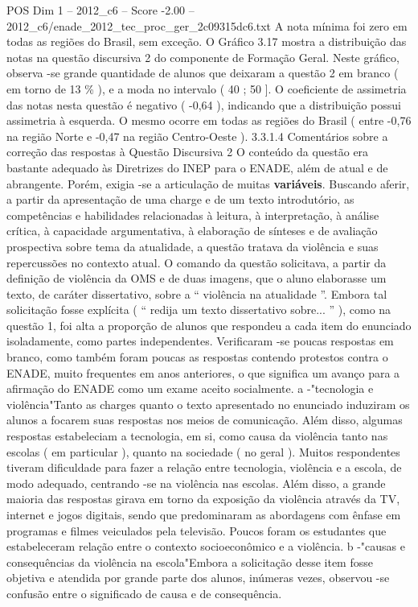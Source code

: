 \begin{textsample}{POS Dim 1 – 2012\_c6 – Score -2.00 – 2012\_c6/enade\_2012\_tec\_proc\_ger\_2c09315dc6.txt}
A nota mínima foi zero em todas as regiões do Brasil, sem exceção.
O Gráfico 3.17 mostra a distribuição das notas na questão discursiva 2 do componente de Formação Geral.
Neste gráfico, observa -se grande quantidade de alunos que deixaram a questão 2 em branco ( em torno de 13 \% ), e a moda no intervalo ( 40 ; 50 ].
O coeficiente de assimetria das notas nesta questão é negativo ( -0,64 ), indicando que a distribuição possui assimetria à esquerda.
O mesmo ocorre em todas as regiões do Brasil ( entre -0,76 na região Norte e -0,47 na região Centro-Oeste ). 3.3.1.4 Comentários sobre a correção das respostas à Questão Discursiva 2 O conteúdo da questão era bastante adequado às Diretrizes do INEP para o ENADE, além de atual e de abrangente.
Porém, exigia -se a articulação de muitas \textbf{variáveis}.
Buscando aferir, a partir da apresentação de uma charge e de um texto introdutório, as competências e habilidades relacionadas à leitura, à interpretação, à análise crítica, à capacidade argumentativa, à elaboração de sínteses e de avaliação prospectiva sobre tema da atualidade, a questão tratava da violência e suas repercussões no contexto atual.
O comando da questão solicitava, a partir da definição de violência da OMS e de duas imagens, que o aluno elaborasse um texto, de caráter dissertativo, sobre a “ violência na atualidade ”.
Embora tal solicitação fosse explícita ( “ redija um texto dissertativo sobre... ” ), como na questão 1, foi alta a proporção de alunos que respondeu a cada item do enunciado isoladamente, como partes independentes.
Verificaram -se poucas respostas em branco, como também foram poucas as respostas contendo protestos contra o ENADE, muito frequentes em anos anteriores, o que significa um avanço para a afirmação do ENADE como um exame aceito socialmente. a -"tecnologia e violência"Tanto as charges quanto o texto apresentado no enunciado induziram os alunos a focarem suas respostas nos meios de comunicação.
Além disso, algumas respostas estabeleciam a tecnologia, em si, como causa da violência tanto nas escolas ( em particular ), quanto na sociedade ( no geral ).
Muitos respondentes tiveram dificuldade para fazer a relação entre tecnologia, violência e a escola, de modo adequado, centrando -se na violência nas escolas.
Além disso, a grande maioria das respostas girava em torno da exposição da violência através da TV, internet e jogos digitais, sendo que predominaram as abordagens com ênfase em programas e filmes veiculados pela televisão.
Poucos foram os estudantes que estabeleceram relação entre o contexto socioeconômico e a violência. b -"causas e consequências da violência na escola"Embora a solicitação desse item fosse objetiva e atendida por grande parte dos alunos, inúmeras vezes, observou -se confusão entre o significado de causa e de consequência.

\end{textsample}
